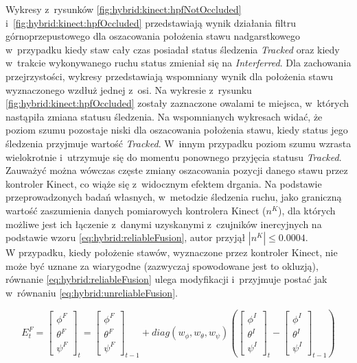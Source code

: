 Wykresy z~rysunków \ref{fig:hybrid:kinect:hpfNotOccluded} i~\ref{fig:hybrid:kinect:hpfOccluded} przedstawiają wynik działania filtru górnoprzepustowego dla oszacowania położenia stawu nadgarstkowego w~przypadku kiedy staw cały czas posiadał status śledzenia \emph{Tracked} oraz kiedy w~trakcie wykonywanego ruchu status zmieniał się na \emph{Interferred}. Dla zachowania przejrzystości, wykresy przedstawiają wspomniany wynik dla położenia stawu wyznaczonego wzdłuż jednej z~osi. Na wykresie z~rysunku \ref{fig:hybrid:kinect:hpfOccluded} zostały zaznaczone owalami te miejsca, w~których nastąpiła zmiana statusu śledzenia. Na wspomnianych wykresach widać, że poziom szumu pozostaje niski dla oszacowania położenia stawu, kiedy status jego śledzenia przyjmuje wartość \emph{Tracked}. W~innym przypadku poziom szumu wzrasta wielokrotnie i~utrzymuje się do momentu ponownego przyjęcia statusu  \emph{Tracked}. Zauważyć można wówczas częste zmiany oszacowania pozycji danego stawu przez kontroler Kinect, co wiąże się z~widocznym efektem drgania. Na podstawie przeprowadzonych badań własnych, w~metodzie śledzenia ruchu, jako graniczną wartość zaszumienia danych pomiarowych kontrolera Kinect ($n^K$), dla których możliwe jest ich łączenie z~danymi uzyskanymi z~czujników inercyjnych na podstawie wzoru \ref{eq:hybrid:reliableFusion}, autor przyjął $|n^K| \le 0.0004$.\\
																
W przypadku, kiedy położenie stawów, wyznaczone przez kontroler Kinect, nie może być uznane za wiarygodne (zazwyczaj spowodowane jest to okluzją), równanie \ref{eq:hybrid:reliableFusion} ulega modyfikacji i~przyjmuje postać jak w~równaniu \ref{eq:hybrid:unreliableFusion}. 
																
\begin{equation} 
	\label{eq:hybrid:unreliableFusion}
	E^F_t = 
	\begin{bmatrix}  \phi^F \\  \theta^F \\  \psi^F \end{bmatrix}_t = 
	\begin{bmatrix}  \phi^F \\  \theta^F \\  \psi^F \end{bmatrix}_{t-1} +
	diag(w_\phi,w_\theta,w_\psi)
	(\begin{bmatrix}  \phi^I \\  \theta^I \\  \psi^I \end{bmatrix}_t -
	\begin{bmatrix}  \phi^I \\  \theta^I \\  \psi^I \end{bmatrix}_{t-1})
\end{equation}
																
